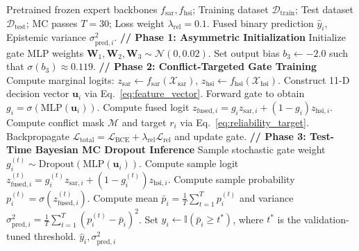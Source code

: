 \documentclass[conference]{IEEEtran}
\begin{document}
\begin{algorithm}[!ht]
\caption{CAFE-Fusion v2 Training and Bayesian Inference}
\label{alg:cafe_fusion}
\begin{algorithmic}[1]
\REQUIRE Pretrained frozen expert backbones $f_{\text{sar}}, f_{\text{hsi}}$; Training dataset $\mathcal{D}_{\text{train}}$; Test dataset $\mathcal{D}_{\text{test}}$; MC passes $T=30$; Loss weight $\lambda_{\text{rel}}=0.1$.
\ENSURE Fused binary prediction $\hat{y}_i$, Epistemic variance $\sigma^2_{\text{pred}, i}$.
\STATE \textbf{// Phase 1: Asymmetric Initialization}
\STATE Initialize gate MLP weights $\mathbf{W}_1, \mathbf{W}_2, \mathbf{W}_3 \sim \mathcal{N}(0, 0.02)$.
\STATE Set output bias $b_3 \leftarrow -2.0$ such that $\sigma(b_3) \approx 0.119$.
\STATE \textbf{// Phase 2: Conflict-Targeted Gate Training}
        \STATE Compute marginal logits: $z_{\text{sar}} \leftarrow f_{\text{sar}}(\mathcal{X}_{\text{sar}})$, $z_{\text{hsi}} \leftarrow f_{\text{hsi}}(\mathcal{X}_{\text{hsi}})$.
        \STATE Construct 11-D decision vector $\mathbf{u}_i$ via Eq.~\eqref{eq:feature_vector}.
        \STATE Forward gate to obtain $g_i = \sigma(\text{MLP}(\mathbf{u}_i))$.
        \STATE Compute fused logit $z_{\text{fused}, i} = g_i z_{\text{sar}, i} + (1 - g_i) z_{\text{hsi}, i}$.
        \STATE Compute conflict mask $\mathcal{M}$ and target $r_i$ via Eq.~\eqref{eq:reliability_target}.
        \STATE Backpropagate $\mathcal{L}_{\text{total}} = \mathcal{L}_{\text{BCE}} + \lambda_{\text{rel}} \mathcal{L}_{\text{rel}}$ and update gate.
    \ENDFOR
\ENDFOR
\STATE \textbf{// Phase 3: Test-Time Bayesian MC Dropout Inference}
        \STATE Sample stochastic gate weight $g_i^{(t)} \sim \text{Dropout}(\text{MLP}(\mathbf{u}_i))$.
        \STATE Compute sample logit $z_{\text{fused}, i}^{(t)} = g_i^{(t)} z_{\text{sar}, i} + (1 - g_i^{(t)}) z_{\text{hsi}, i}$.
        \STATE Compute sample probability $p_i^{(t)} = \sigma(z_{\text{fused}, i}^{(t)})$.
    \ENDFOR
    \STATE Compute mean $\bar{p}_i = \frac{1}{T} \sum_{t=1}^T p_i^{(t)}$ and variance $\sigma^2_{\text{pred}, i} = \frac{1}{T}\sum_{t=1}^T (p_i^{(t)} - \bar{p}_i)^2$.
    \STATE Set $\hat{y}_i \leftarrow \mathbb{I}(\bar{p}_i \ge t^*)$, where $t^*$ is the validation-tuned threshold.
\ENDFOR
\RETURN $\hat{y}_i, \sigma^2_{\text{pred}, i}$
\end{algorithmic}
\end{algorithm}
\end{document}
